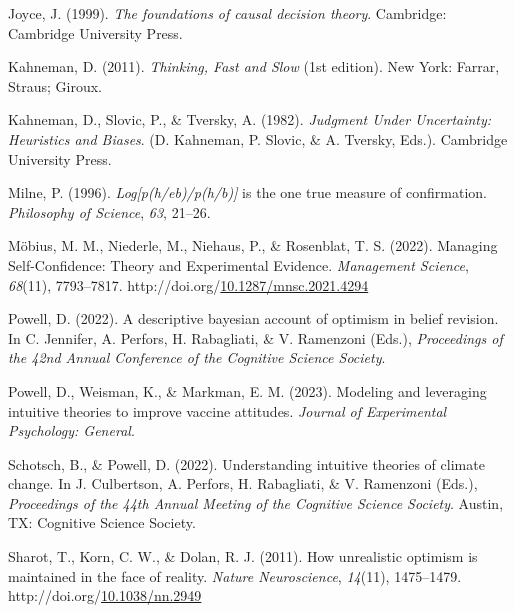 \documentclass[10pt, letterpaper]{article}
\newenvironment{CSLReferences}%
  {}%
  {\par}
\begin{document}
\begin{CSLReferences}{1}{0}
\leavevmode{}%
Joyce, J. (1999). \emph{The foundations of causal decision theory}.
Cambridge: Cambridge University Press.

\leavevmode{}%
Kahneman, D. (2011). \emph{Thinking, {Fast} and {Slow}} (1st edition).
New York: Farrar, Straus; Giroux.

\leavevmode{}%
Kahneman, D., Slovic, P., \& Tversky, A. (1982). \emph{Judgment {Under}
{Uncertainty}: {Heuristics} and {Biases}}. (D. Kahneman, P. Slovic, \&
A. Tversky, Eds.). Cambridge University Press.

\leavevmode{}%
Milne, P. (1996). \emph{Log{[}p(h/eb)/p(h/b){]}} is the one true measure
of confirmation. \emph{Philosophy of Science}, \emph{63}, 21--26.

\leavevmode{}%
Möbius, M. M., Niederle, M., Niehaus, P., \& Rosenblat, T. S. (2022).
Managing {Self}-{Confidence}: {Theory} and {Experimental} {Evidence}.
\emph{Management Science}, \emph{68}(11), 7793--7817.
http://doi.org/\href{https://doi.org/10.1287/mnsc.2021.4294}{10.1287/mnsc.2021.4294}

\leavevmode{}%
Powell, D. (2022). A descriptive bayesian account of optimism in belief
revision. In C. Jennifer, A. Perfors, H. Rabagliati, \& V. Ramenzoni
(Eds.), \emph{Proceedings of the 42nd {Annual} {Conference} of the
{Cognitive} {Science} {Society}}.

\leavevmode{}%
Powell, D., Weisman, K., \& Markman, E. M. (2023). Modeling and
leveraging intuitive theories to improve vaccine attitudes.
\emph{Journal of Experimental Psychology: General}.

\leavevmode{}%
Schotsch, B., \& Powell, D. (2022). Understanding intuitive theories of
climate change. In J. Culbertson, A. Perfors, H. Rabagliati, \& V.
Ramenzoni (Eds.), \emph{Proceedings of the 44th {Annual} {Meeting} of
the {Cognitive} {Science} {Society}}. Austin, TX: Cognitive Science
Society.

\leavevmode{}%
Sharot, T., Korn, C. W., \& Dolan, R. J. (2011). How unrealistic
optimism is maintained in the face of reality. \emph{Nature
Neuroscience}, \emph{14}(11), 1475--1479.
http://doi.org/\href{https://doi.org/10.1038/nn.2949}{10.1038/nn.2949}


\end{CSLReferences}
\end{document}
